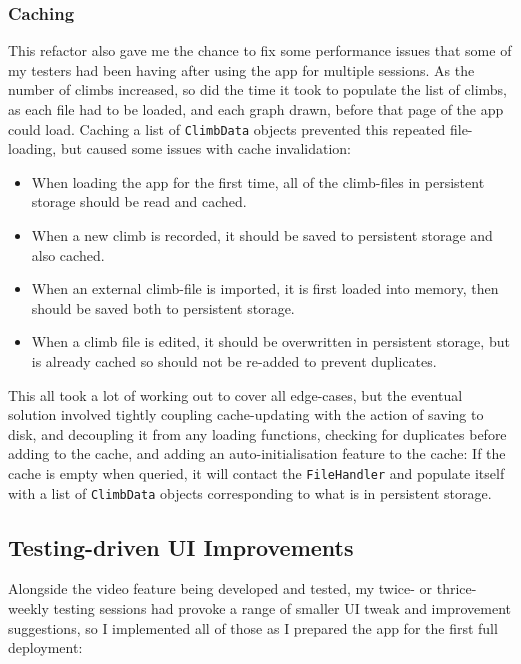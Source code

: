 \subsubsection{Caching}
This refactor also gave me the chance to fix some performance issues that some of my testers had been having after using the app for multiple sessions.
As the number of climbs increased, so did the time it took to populate the list of climbs, as each file had to be loaded, and each graph drawn, before that page of the app could load.
Caching a list of \verb|ClimbData| objects prevented this repeated file-loading, but caused some issues with cache invalidation:
\begin{itemize}
    \item When loading the app for the first time, all of the climb-files in persistent storage should be read and cached.
    \item When a new climb is recorded, it should be saved to persistent storage and also cached.
    \item When an external climb-file is imported, it is first loaded into memory, then should be saved both to persistent storage.
    \item When a climb file is edited, it should be overwritten in persistent storage, but is already cached so should not be re-added to prevent duplicates.
\end{itemize}
This all took a lot of working out to cover all edge-cases, but the eventual solution involved tightly coupling cache-updating with the action of saving to disk, and decoupling it from any loading functions, checking for duplicates before adding to the cache, and adding an auto-initialisation feature to the cache:
If the cache is empty when queried, it will contact the \verb|FileHandler| and populate itself with a list of \verb|ClimbData| objects corresponding to what is in persistent storage.




\subsection{Testing-driven UI Improvements}
Alongside the video feature being developed and tested, my twice- or thrice-weekly testing sessions had provoke a range of smaller UI tweak and improvement suggestions, so I implemented all of those as I prepared the app for the first full deployment:

